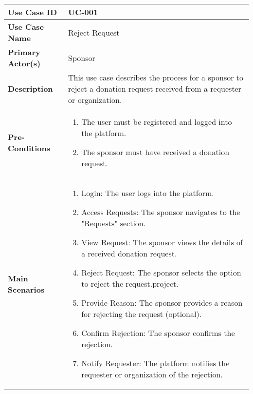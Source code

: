 \begin{table}[!ht]
    \centering
    \renewcommand{\arraystretch}{1.3} %
    \begin{tabularx}{\textwidth}{|l|X|}
        \hline
        \textbf{Use Case ID} & UC-001 \\
        \hline
        \textbf{Use Case Name} & Reject Request \\
        \hline
        \textbf{Primary Actor(s)} & Sponsor \\
        \hline
        \textbf{Description} &  This use case describes the process for a sponsor to reject a donation request received from a requester or organization.\\
        \hline
        \textbf{Pre-Conditions} & 
        \begin{enumerate}[label=\arabic*.,itemsep=0pt]
            \item The user must be registered and logged into the platform.
            \item The sponsor must have received a donation request.
        \end{enumerate} \\
        \hline
        \textbf{Main Scenarios} & 
        \begin{enumerate}[label=\arabic*.,itemsep=0pt]
            \item Login: The user logs into the platform.
            \item Access Requests: The sponsor navigates to the "Requests" section.
            \item View Request: The sponsor views the details of a received donation request.
            \item Reject Request: The sponsor selects the option to reject the request.project.
            \item Provide Reason: The sponsor provides a reason for rejecting the request (optional).
            \item Confirm Rejection: The sponsor confirms the rejection.
            \item Notify Requester: The platform notifies the requester or organization of the rejection.
        \end{enumerate} \\
        

\end{tabularx}
\end{table}
